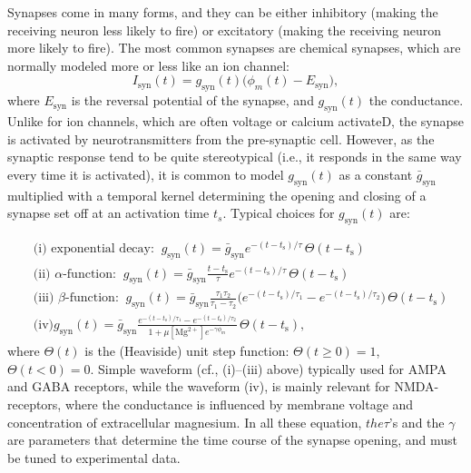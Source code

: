 Synapses come in many forms, and they can be either inhibitory (making the receiving neuron less likely to fire) or excitatory (making the receiving neuron more likely to fire). The most common synapses are chemical synapses, which are normally modeled more or less like an ion channel:
\begin{equation}
I_\text{syn}(t) = g_\text{syn}(t) \big( \phi_m(t)-E_\text{syn} \big), 
\label{eq:chemicalsynapse}
\end{equation}
where $E_\text{syn}$ is the reversal potential of the synapse, and $g_\text{syn}(t)$ the conductance. Unlike for ion channels, which are often voltage or calcium activateD, the synapse is activated by neurotransmitters from the pre-synaptic cell. However, as the synaptic response tend to be quite stereotypical (i.e., it responds in the same way every time it is activated), it is common to model $g_\text{syn}(t)$ as a constant $\bar{g}_\text{syn}$ multiplied with a temporal kernel determining the opening and closing of a synapse set off at an activation time $t_s$. Typical choices for $g_\text{syn}(t)$ are: 

\begin{align}
&\text{(i) exponential decay:} \;\; g_\text{syn}(t) = \bar{g}_\text{syn} e^{-(t-t_\text{s})/\tau}\, \Theta(t-t_\text{s}) \\
&\text{(ii) $\alpha$-function:} \;\; g_\text{syn}(t) = \bar{g}_\text{syn} \frac{t-t_\text{s}}{\tau} e^{-(t-t_\text{s})/\tau} \, \Theta(t-t_\text{s}) \\
&\text{(iii) $\beta$-function:} \;\; g_\text{syn}(t) = \bar{g}_\text{syn} \frac{\tau_1 \tau_2}{\tau_1-\tau_2} 
\Big( e^{-(t-t_\text{s})/\tau_1} - e^{-(t-t_\text{s})/\tau_2} \Big) \, \Theta(t-t_\text{s}) \\
& \text{(iv)} g_\text{syn}(t) = \bar{g}_\text{syn} \frac{e^{-(t-t_\text{s})/\tau_1} - e^{-(t-t_\text{s})/\tau_2}} {1+\mu [\text{Mg}^{2+}] e^{-\gamma \phi_m} } \, \Theta(t-t_\text{s}),
\label{eq:synapseforms}
\end{align}
where $\Theta(t)$ is the (Heaviside) unit step function: $\Theta(t \ge 0)=1$,   $\Theta(t< 0)=0$. Simple waveform (cf., (i)--(iii) above) typically used for AMPA  and GABA receptors, while the waveform (iv), is mainly relevant for NMDA-receptors, 
where the conductance is influenced by membrane voltage and concentration of extracellular magnesium. In all these equation, $the \tau$'s and the $\gamma$ are parameters that determine the time course of the synapse opening, and must be tuned to experimental data. 

